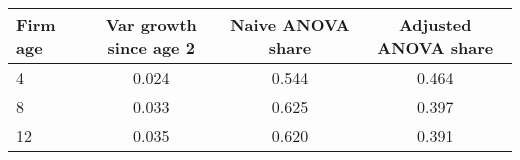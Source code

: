 \begin{tabular}{lccc}
Firm age & Var  growth since age 2 & Naive ANOVA share & Adjusted ANOVA share \\
\hline
4 &     0.024 &  0.544 &  0.464 \\
8 &     0.033 &  0.625 &  0.397 \\
12 &     0.035 &  0.620 &  0.391 \\
\end{tabular}
